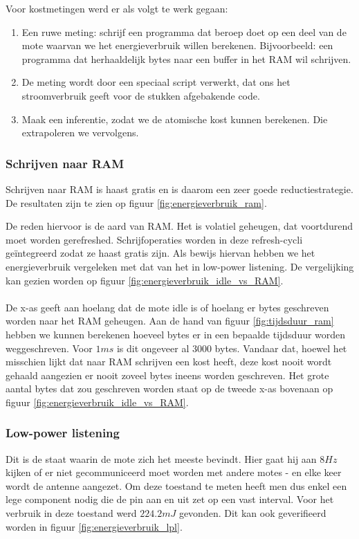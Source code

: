 \documentclass[11pt]{article}
\begin{document}
Voor kostmetingen werd er als volgt te werk gegaan:

\begin{enumerate}
\item Een ruwe meting: schrijf een programma dat beroep doet op een deel
van de mote waarvan we het energieverbruik willen berekenen. Bijvoorbeeld: een
programma dat herhaaldelijk bytes naar een buffer in het RAM wil schrijven. 
\item De meting wordt door een speciaal script verwerkt, dat ons het stroomverbruik geeft voor de stukken afgebakende code.
\item Maak een inferentie, zodat we de atomische kost kunnen berekenen. Die extrapoleren we vervolgens.
\end{enumerate}

\subsubsection{Schrijven naar RAM}

Schrijven naar RAM is haast gratis en is daarom een zeer goede
reductiestrategie. De resultaten zijn te zien op figuur \ref{fig:energieverbruik_ram}.

De reden hiervoor is de aard van RAM. Het is volatiel geheugen, dat voortdurend
moet worden gerefreshed. Schrijfoperaties worden in deze refresh-cycli
ge\"integreerd zodat ze haast gratis zijn. Als bewijs hiervan hebben we het energieverbruik vergeleken met dat van het in low-power listening. 
De vergelijking kan gezien worden op figuur \ref{fig:energieverbruik_idle_vs_RAM}.\\
\\
De x-as geeft aan hoelang dat de mote idle is of hoelang er bytes geschreven worden naar het RAM geheugen. Aan de hand van figuur \ref{fig:tijdsduur_ram} hebben we kunnen berekenen hoeveel bytes er in een bepaalde tijdsduur worden weggeschreven. Voor $1ms$ is dit ongeveer al 3000 bytes. Vandaar dat, hoewel het misschien lijkt dat naar RAM schrijven een kost heeft, deze kost nooit wordt gehaald aangezien er nooit zoveel bytes ineens worden geschreven. Het grote aantal bytes dat zou geschreven worden staat op de tweede x-as bovenaan op figuur \ref{fig:energieverbruik_idle_vs_RAM}. 
\subsubsection{Low-power listening}
Dit is de staat waarin de mote zich het meeste bevindt. Hier gaat hij aan $8Hz$
kijken of er niet gecommuniceerd moet worden met andere motes - en elke keer
wordt de antenne aangezet. Om deze toestand te meten heeft men dus enkel een
lege component nodig die de pin aan en uit zet op een vast interval. Voor het
verbruik in deze toestand werd $224.2mJ$ gevonden. Dit kan ook geverifieerd worden
in figuur \ref{fig:energieverbruik_lpl}.
\end{document}
